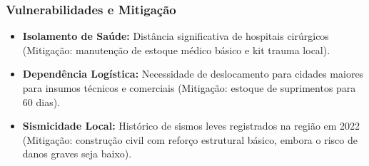 \subsubsection{Vulnerabilidades e
Mitigação}

\begin{itemize}
\tightlist
\item
  \textbf{Isolamento de Saúde:} Distância significativa de hospitais
  cirúrgicos (Mitigação: manutenção de estoque médico básico e kit
  trauma local).
\item
  \textbf{Dependência Logística:} Necessidade de deslocamento para
  cidades maiores para insumos técnicos e comerciais (Mitigação: estoque
  de suprimentos para 60 dias).
\item
  \textbf{Sismicidade Local:} Histórico de sismos leves registrados na
  região em 2022 (Mitigação: construção civil com reforço estrutural
  básico, embora o risco de danos graves seja baixo).
\end{itemize}

